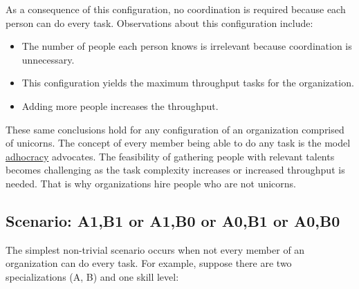 As a consequence of this configuration, no coordination is required because each person can do every task. Observations about this configuration include:
\begin{itemize}
    \item The number of people each person knows is irrelevant because coordination is unnecessary.
    \item This configuration yields the maximum throughput tasks for the organization.
    \item Adding more people increases the throughput.
\end{itemize}

These same conclusions hold for any configuration of an organization comprised of unicorns. 
The concept of every member being able to do any task is the model 
\href{https://en.wikipedia.org/wiki/Adhocracy}{adhocracy}%
advocates. The feasibility of gathering people with relevant talents becomes challenging as the task complexity increases or increased throughput is needed. That is why organizations hire people who are not unicorns. 



\subsection*{Scenario: A1,B1 or A1,B0 or A0,B1 or A0,B0}

The simplest non-trivial scenario occurs when not every member of an organization can do every task. For example, suppose  there are two specializations (A, B) and one skill level: 

